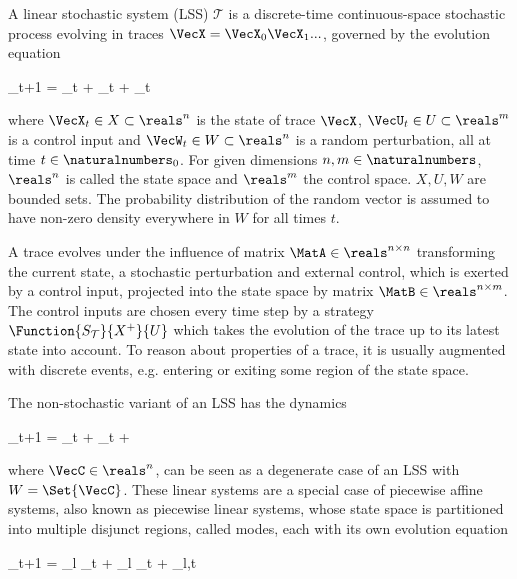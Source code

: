 \startsubsection[title={Linear Stochastic Systems}]

    A linear stochastic system (LSS) $\mathcal{T}$ is a discrete-time continuous-space stochastic process evolving in traces $\VecX = \VecX_0 \VecX_1 ...$, governed by the evolution equation

    \startformula
        \VecX_{t+1} = \MatA \VecX_t + \MatB \VecU_t + \VecW_t \EndComma
    \stopformula

    where $\VecX_t \in X \subset \reals^n$ is the state of trace $\VecX$,
    $\VecU_t \in U \subset \reals^m$ is a control input and
    $\VecW_t \in W \subset \reals^n$ is a random perturbation, all at time $t \in \naturalnumbers_0$.
    For given dimensions $n, m \in \naturalnumbers$, $\reals^n$ is called the state space and $\reals^m$ the control space.
    $X, U, W$ are bounded sets.
    The probability distribution of the random vector is assumed to have non-zero density everywhere in $W$ for all times $t$.

    A trace evolves under the influence of matrix $\MatA \in \reals^{n \times n}$ transforming the current state, a stochastic perturbation and external control, which is exerted by a control input, projected into the state space by matrix $\MatB \in \reals^{n \times m}$.
    The control inputs are chosen every time step by a strategy $\Function{S_\mathcal{T}}{X^+}{U}$ which takes the evolution of the trace up to its latest state into account.
    To reason about properties of a trace, it is usually augmented with discrete events, e.g. entering or exiting some region of the state space.

\stopsubsection


\startsubsection[title={Related Systems}]

    The non-stochastic variant of an LSS has the dynamics

    \startformula
        \VecX_{t+1} = \MatA \VecX_t + \MatB \VecU_t + \VecC \EndComma
    \stopformula

    where $\VecC \in \reals^n$, can be seen as a degenerate case of an LSS with $W = \Set{\VecC}$.
    These linear systems are a special case of piecewise affine systems, also known as piecewise linear systems, whose state space is partitioned into multiple disjunct regions, called modes, each with its own evolution equation

    \startformula
        \VecX_{t+1} = \MatA_l \VecX_t + \MatB_l \VecU_t + \VecW_{l,t} \EndComma
    \stopformula

